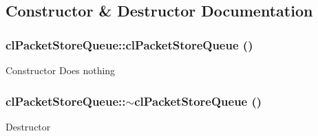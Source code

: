 \subsection{Constructor \& Destructor Documentation}
\hypertarget{classcl_packet_store_queue_a4616668741a61b8c334c27abdea4fb15}{
\subsubsection[{clPacketStoreQueue}]{\setlength{\rightskip}{0pt plus 5cm}clPacketStoreQueue::clPacketStoreQueue ()}}
\label{classcl_packet_store_queue_a4616668741a61b8c334c27abdea4fb15}
Constructor Does nothing \hypertarget{classcl_packet_store_queue_a5508ed725e4d75b8c4292d30eccd00b8}{
\subsubsection[{$\sim$clPacketStoreQueue}]{\setlength{\rightskip}{0pt plus 5cm}clPacketStoreQueue::$\sim$clPacketStoreQueue ()}}
\label{classcl_packet_store_queue_a5508ed725e4d75b8c4292d30eccd00b8}
Destructor 

